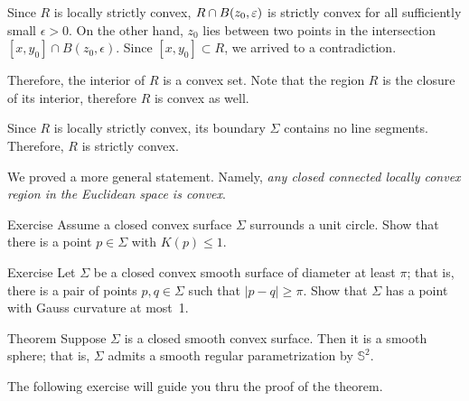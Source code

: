 Since $R$ is locally strictly convex, $R\z\cap B(z_0,\epsilon)$ is strictly convex for all sufficiently small $\epsilon>0$.
On the other hand, $z_0$ lies between two points in the intersection $[x,y_0]\cap B(z_0,\epsilon)$.
Since $[x,y_0]\subset R$, we arrived to a contradiction.

Therefore, the interior of $R$ is a convex set.
Note that the region $R$ is the closure of its interior, therefore $R$ is convex as well.

Since $R$ is locally strictly convex, its boundary $\Sigma$ contains no line segments.
Therefore, $R$ is strictly convex.
\qeds

We proved a more general statement.
Namely, {}\emph{any closed connected locally convex region in the Euclidean space is convex}.

\begin{thm}{Exercise}\label{ex:surrounds-disc}
Assume a closed convex surface $\Sigma$ surrounds a unit circle.
Show that there is a point  $p \in \Sigma$ with $K(p)\le 1$. 
\end{thm} 

\begin{thm}{Exercise}\label{ex:small-gauss}
Let $\Sigma$ be a closed convex smooth surface of diameter at least $\pi$;
that is, there is a pair of points $p,q\in\Sigma$ such that $|p-q|\ge \pi$.
Show that $\Sigma$ has a point with Gauss curvature at most~1.
\end{thm}

\begin{thm}{Theorem}\label{thm:convex-closed}
Suppose $\Sigma$ is a closed smooth convex surface.
Then it is a smooth sphere; that is, $\Sigma$ admits a smooth regular parametrization by $\mathbb{S}^2$.\end{thm}

The following exercise will guide you thru the proof of the theorem.

